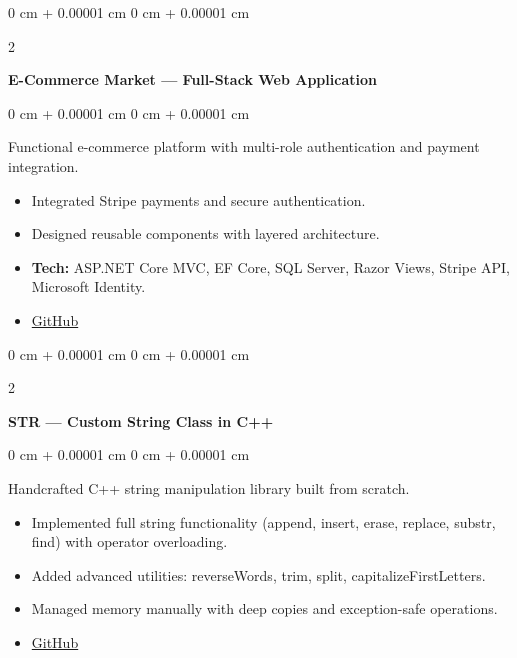 \documentclass[10pt, letterpaper]{article}
\newenvironment{highlights}{
    \begin{itemize}[
        topsep=0.10 cm,
        parsep=0.10 cm,
        partopsep=0pt,
        itemsep=0pt,
        leftmargin=0 cm + 10pt
    ]
}{
    \end{itemize}
} %
\newenvironment{onecolentry}{
    \begin{adjustwidth}{
        0 cm + 0.00001 cm
    }{
        0 cm + 0.00001 cm
    }
}{
    \end{adjustwidth}
} %
\newenvironment{twocolentry}[2][]{
    \onecolentry
    \def\secondColumn{#2}
    \setcolumnwidth{\fill, 4.5 cm}
    \begin{paracol}{2}
}{
    \switchcolumn \raggedleft \secondColumn
    \end{paracol}
    \endonecolentry
} %
\begin{document}
    \vspace{0.2 cm}
    
    \begin{twocolentry}{}
        \textbf{E-Commerce Market — Full-Stack Web Application}
    \end{twocolentry}
    \begin{onecolentry}
        Functional e-commerce platform with multi-role authentication and payment integration.
        \begin{highlights}
            \item Integrated Stripe payments and secure authentication.
            \item Designed reusable components with layered architecture.
            \item \textbf{Tech:} ASP.NET Core MVC, EF Core, SQL Server, Razor Views, Stripe API, Microsoft Identity.
            \item \href{https://github.com/M7-TROJAN/myshop-ecommerce-app}{GitHub}
        \end{highlights}
    \end{onecolentry}
    
    \vspace{0.2 cm}
    
    \begin{twocolentry}{}
        \textbf{STR — Custom String Class in C++}
    \end{twocolentry}
    \begin{onecolentry}
        Handcrafted C++ string manipulation library built from scratch.
        \begin{highlights}
            \item Implemented full string functionality (append, insert, erase, replace, substr, find) with operator overloading.
            \item Added advanced utilities: reverseWords, trim, split, capitalizeFirstLetters.
            \item Managed memory manually with deep copies and exception-safe operations.
            \item \href{https://github.com/M7-TROJAN/CPlusPlus-Console-Projects/tree/main/my\%20own\%20string\%20class\%20from\%20A\%20To\%20Z}{GitHub}
        \end{highlights}
    \end{onecolentry}
    
    \vspace{0.2 cm}
    
\end{document}
